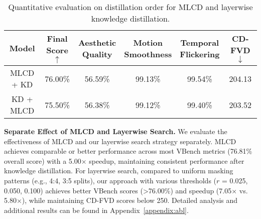 \begin{table}[ht]
\scriptsize \centering
\setlength{\tabcolsep}{4pt}
\caption{Quantitative evaluation on distillation order for MLCD and layerwise knowledge distillation.}
\begin{tabular}{cccccc}
\toprule 
\textbf{Model} & \makecell{\textbf{Final} \\ \textbf{Score}} $\uparrow$ & \makecell{\textbf{Aesthetic} \\ \textbf{Quality}} & \makecell{\textbf{Motion} \\ \textbf{Smoothness}} & \makecell{\textbf{Temporal} \\ \textbf{Flickering}} & \textbf{CD-FVD} $\downarrow$ \\
\midrule
MLCD + KD & 76.00\% & 56.59\% & 99.13\% & 99.54\% & 204.13 \\
KD + MLCD & 75.50\% & 56.38\% & 99.12\% & 99.40\% & 203.52 \\
\bottomrule
\end{tabular}
\label{tab:ablation_order1}
\end{table}


\textbf{Separate Effect of MLCD and Layerwise Search.} We evaluate the effectiveness of MLCD and our layerwise search strategy separately. MLCD achieves comparable or better performance across most VBench metrics (76.81\% overall score) with a 5.00$\times$ speedup, maintaining consistent performance after knowledge distillation. For layerwise search, compared to uniform masking patterns (e.g., 4:4, 3:5 splits), our approach with various thresholds ($r$ = 0.025, 0.050, 0.100) achieves better VBench scores (>76.00\%) and speedup (7.05$\times$ vs. 5.80$\times$), while maintaining CD-FVD scores below 250. Detailed analysis and additional results can be found in Appendix~\ref{appendix:abl}.

